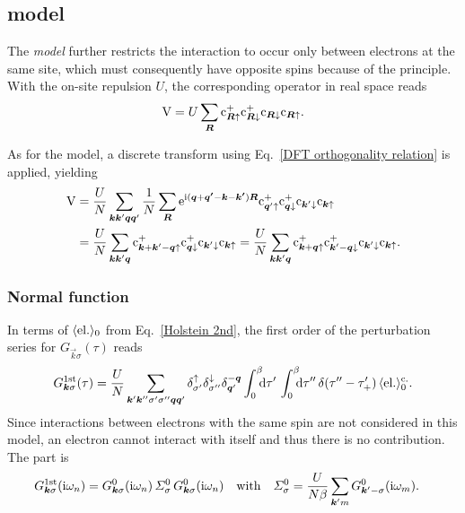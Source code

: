\subsection{ model}
\label{Hubbard model}

The \emph{ model} further restricts the  interaction
to occur only between electrons at the same site, which must consequently have
opposite spins because of the  principle. With the on-site
 repulsion $U$, the corresponding operator in real space reads
\cite{vonderLindenBergerValasek95}
%
\begin{equation*}
    \mathrm V = U \sum_{\boldsymbol R}
    \mathrm c_{\boldsymbol R \uparrow}^+
    \mathrm c_{\boldsymbol R \downarrow}^+
    \mathrm c_{\boldsymbol R \downarrow}
    \mathrm c_{\boldsymbol R \uparrow}.
\end{equation*}

As for the  model, a discrete  transform using
Eq.~\ref{DFT orthogonality relation} is applied, yielding
%
\begin{align*}
    \mathrm V &=
    \frac U N \sum_{\boldsymbol k \boldsymbol k' \boldsymbol q \boldsymbol q'}
    \frac 1 N \sum_{\boldsymbol R}
    \mathrm e^{\mathrm i (\boldsymbol q + \boldsymbol{q'} - \boldsymbol k - \boldsymbol{k'}) \boldsymbol R}
    \mathrm c_{\boldsymbol q' \uparrow}^+
    \mathrm c_{\boldsymbol q \downarrow}^+
    \mathrm c_{\boldsymbol k' \downarrow}
    \mathrm c_{\boldsymbol k \uparrow}
    \\
    &= \frac U N \sum_{\boldsymbol k \boldsymbol k' \boldsymbol q}
    \mathrm c_{\boldsymbol k + \boldsymbol k' - \boldsymbol q \uparrow}^+
    \mathrm c_{\boldsymbol q \downarrow}^+
    \mathrm c_{\boldsymbol k' \downarrow}
    \mathrm c_{\boldsymbol k \uparrow}
    = \frac U N \sum_{\boldsymbol k \boldsymbol k' \boldsymbol q}
    \mathrm c_{\boldsymbol k + \boldsymbol q \uparrow}^+
    \mathrm c_{\boldsymbol k' - \boldsymbol q \downarrow}^+
    \mathrm c_{\boldsymbol k' \downarrow} \mathrm c_{\boldsymbol k \uparrow}.
\end{align*}

\subsubsection{Normal  function}

In terms of $\langle\text{el.}\rangle_0$ from Eq.~\ref{Holstein 2nd}, the first order of
the perturbation series for $G_{\vec k \sigma}(\tau)$ reads
%
\begin{equation*}
    G \super{1st}_{\vec k \sigma}(\tau) =
    \frac U N \sum_{\vec k' \vec k'' \sigma' \sigma'' \vec q \vec q'}
    \delta_{\sigma'}^\up \delta_{\sigma''}^\down \delta_{\vec q'}^{-\vec q}
    \int \from 0 \till \beta \D \tau' \,
    \int \from 0 \till \beta \D \tau'' \,
    \delta(\tau'' - \tau'_+) \,
    \av{\text{el.}}_0 \super{c.}.
\end{equation*}
%
Since interactions between electrons with the same spin are not considered in
this model, an electron cannot interact with itself and thus there is no
 contribution. The  part is
%
\begin{align*}
    G \sp{\text{1st}}_{\boldsymbol k \sigma}(\mathrm i \omega_n)
    &= G^0_{\boldsymbol k \sigma}(\mathrm i \omega_n) \,
    \varSigma^0_\sigma \,
    G^0_{\boldsymbol k \sigma}(\mathrm i \omega_n)
    \quad \text{with} \quad
    \varSigma^0_\sigma
    = \frac U {N \beta} \sum_{\boldsymbol k' m} G^0_{\boldsymbol k' -\sigma}(\mathrm i \omega_m).
\end{align*}

